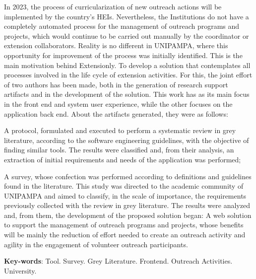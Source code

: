 \begin{resumo}[Abstract]
  In 2023, the process of curricularization of new outreach actions will be implemented by the country's \aclp{HEI}. Nevertheless, the Institutions do not have a completely automated process for the management of outreach programs and projects, which would continue to be carried out manually by the coordinator or extension collaborators. Reality is no different in \acs{UNIPAMPA}, where this opportunity for improvement of the process was initially identified. This is the main motivation behind Extensionly. To develop a solution that contemplates all processes involved in the life cycle of extension activities. For this, the joint effort of two authors has been made, both in the generation of research support artifacts and in the development of the solution. This work has as its main focus in the front end and system user experience, while the other focuses on the application back end. About the artifacts generated, they were as follows:
  \begin{inparaenum}[(a)]
    \item A protocol, formulated and executed to perform a systematic review in grey literature, according to the software engineering guidelines, with the objective of finding similar tools. The results were classified and, from their analysis, an extraction of initial requirements and needs of the application was performed;
    \item A survey, whose confection was performed according to definitions and guidelines found in the literature. This study was directed to the academic community of \acs{UNIPAMPA} and aimed to classify, in the scale of importance, the requirements previously collected with the review in grey literature. The results were analyzed and, from them, the development of the proposed solution began: A web solution to support the management of outreach programs and projects, whose benefits will be mainly the reduction of effort needed to create an outreach activity and agility in the engagement of volunteer outreach participants.
  \end{inparaenum}

  \vspace{\onelineskip}

  \noindent
  \textbf{Key-words}: Tool. Survey. Grey Literature. Frontend. Outreach Activities. University.
\end{resumo}
